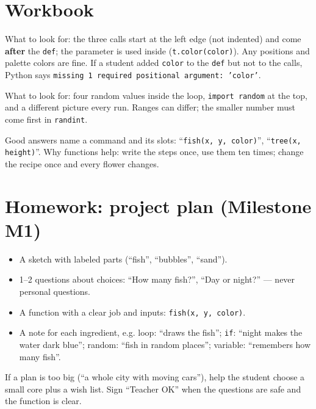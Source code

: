 
\section{Workbook}
\begin{answer}
What to look for: the three calls start at the left edge (not indented) and come \textbf{after} the \texttt{def}; the parameter is used inside (\texttt{t.color(color)}). Any positions and palette colors are fine. If a student added \texttt{color} to the \texttt{def} but not to the calls, Python says \texttt{missing 1 required positional argument: 'color'}.
\end{answer}

\begin{answer}
What to look for: four random values inside the loop, \texttt{import random} at the top, and a different picture every run. Ranges can differ; the smaller number must come first in \texttt{randint}.
\end{answer}

\begin{answer}[Reflection]
Good answers name a command and its slots: \enquote{\texttt{fish(x, y, color)}}, \enquote{\texttt{tree(x, height)}}. Why functions help: write the steps once, use them ten times; change the recipe once and every flower changes.
\end{answer}

\section{Homework: project plan (Milestone M1)}
\begin{answer}
\begin{itemize}[leftmargin=1.2em,itemsep=1pt]
  \item A sketch with labeled parts (\enquote{fish}, \enquote{bubbles}, \enquote{sand}).
  \item 1--2 questions about choices: \enquote{How many fish?}, \enquote{Day or night?} --- never personal questions.
  \item A function with a clear job and inputs: \texttt{fish(x, y, color)}.
  \item A note for each ingredient, e.g. loop: \enquote{draws the fish}; \texttt{if}: \enquote{night makes the water dark blue}; random: \enquote{fish in random places}; variable: \enquote{remembers how many fish}.
\end{itemize}
If a plan is too big (\enquote{a whole city with moving cars}), help the student choose a small core plus a wish list. Sign \enquote{Teacher OK} when the questions are safe and the function is clear.
\end{answer}

